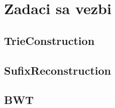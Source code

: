 \section{Zadaci sa vezbi}

\setexamplecodestyle
\subsection{TrieConstruction}
%

\subsection{SufixReconstruction}
%

\subsection{BWT}
%
